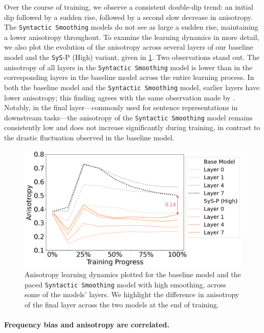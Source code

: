 Over the course of training, we observe a consistent double-dip trend: an initial dip followed by a sudden rise, followed by a second slow decrease in anisotropy. The \texttt{Syntactic Smoothing} models do not see as large a sudden rise, maintaining a lower anisotropy throughout. To examine the learning dynamics in more detail, we also plot the evolution of the anisotropy across several layers of our baseline model and the \texttt{SyS}-P (High) variant, given in \cref{fig:anisotropy-layers}. Two observations stand out. The anisotropy of all layers in the \texttt{Syntactic Smoothing} model is lower than in the corresponding layers in the baseline model across the entire learning process. In both the baseline model and the \texttt{Syntactic Smoothing} model, earlier layers have lower anisotropy; this finding agrees with the same observation made by \citeauthor{ethayarajh2019contextual}. Notably, in the final layer—commonly used for sentence representations in downstream tasks—the anisotropy of the \texttt{Syntactic Smoothing} model remains consistently low and does not increase significantly during training, in contrast to the drastic fluctuation observed in the baseline model. 

\begin{figure}[ht!]
    \centering
    \includegraphics[width=0.75\linewidth]{chapters/syntatic-smoothing/figures/anisotropy-layers.png}
    \caption{Anisotropy learning dynamics plotted for the baseline model and the paced \texttt{Syntactic Smoothing} model with high smoothing, across some of the models' layers. We highlight the difference in anisotropy of the final layer across the two models at the end of training.}
    \label{fig:anisotropy-layers}
    \vspace{-1em}
\end{figure}

\paragraph{Frequency bias and anisotropy are correlated.}

